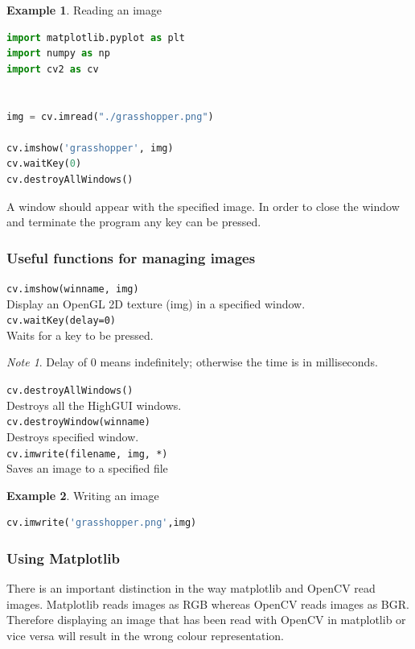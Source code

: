 \documentclass{article}
\theoremstyle{definition}
\newtheorem{ex}{Example}[subsection]
\theoremstyle{remark}
\newtheorem*{nb}{Note}
\newcommand{\func}[2]{\noindent\lstinline{#1}\\#2}
\begin{document}
\break

\begin{ex} Reading an image
\begin{lstlisting}[language=Python]
import matplotlib.pyplot as plt
import numpy as np
import cv2 as cv


img = cv.imread("./grasshopper.png")

cv.imshow('grasshopper', img)
cv.waitKey(0)
cv.destroyAllWindows()
\end{lstlisting}

\noindent A window should appear with the specified image. In order to close the window and terminate the program any key can be pressed.
\end{ex}

\subsubsection{Useful functions for managing images}

\func{cv.imshow(winname, img)}{
Display an OpenGL 2D texture (img) in a specified window.\\
}

\func{cv.waitKey(delay=0)}{
Waits for a key to be pressed.
}
\begin{nb}
Delay of 0 means indefinitely; otherwise the time is in milliseconds.\\
\end{nb}

\func{cv.destroyAllWindows()}{
Destroys all the HighGUI windows.\\
}

\func{cv.destroyWindow(winname)}{
Destroys specified window.\\
}

\func{cv.imwrite(filename, img, *)}{
    Saves an image to a specified file
}

\begin{ex} Writing an image
\begin{lstlisting}[language=Python]
cv.imwrite('grasshopper.png',img)
\end{lstlisting}
\end{ex}

\subsubsection{Using Matplotlib}

There is an important distinction in the way matplotlib and OpenCV read images. Matplotlib reads images as RGB whereas OpenCV reads images as BGR. Therefore displaying an image that has been read with OpenCV in matplotlib or vice versa will result in the wrong colour representation.\\
\end{document}
